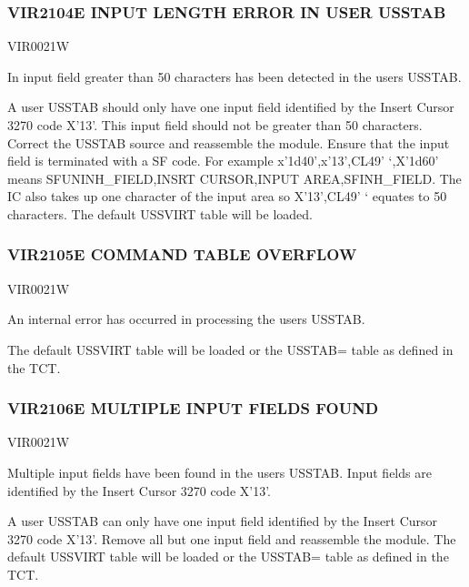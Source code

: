 \documentclass[letterpaper,10pt,english]{sphinxmanual}
\begin{document}
\subsubsection{VIR2104E INPUT LENGTH ERROR IN USER USSTAB}
\label{\detokenize{messages:vir2104e-input-length-error-in-user-usstab}}\begin{description}
\sphinxAtStartPar
VIR0021W

\sphinxAtStartPar
In input field greater than 50 characters has been detected in the users USSTAB.

\sphinxAtStartPar
A user USSTAB should only have one input field identified by the Insert Cursor 3270 code X’13’. This input field should not be greater than 50 characters. Correct the USSTAB source and reassemble the module. Ensure that the input field is terminated with a SF code. For example x’1d40’,x’13’,CL49’ ‘,X’1d60’ means SFUNINH\_FIELD,INSRT CURSOR,INPUT AREA,SFINH\_FIELD. The IC also takes up one character of the input area so X’13’,CL49’ ‘ equates to 50 characters. The default USSVIRT table will be loaded.

\end{description}


\subsubsection{VIR2105E COMMAND TABLE OVERFLOW}
\label{\detokenize{messages:vir2105e-command-table-overflow}}\begin{description}
\sphinxAtStartPar
VIR0021W

\sphinxAtStartPar
An internal error has occurred in processing the users USSTAB.

\sphinxAtStartPar
The default USSVIRT table will be loaded or the USSTAB= table as defined in the TCT.

\end{description}


\subsubsection{VIR2106E MULTIPLE INPUT FIELDS FOUND}
\label{\detokenize{messages:vir2106e-multiple-input-fields-found}}\begin{description}
\sphinxAtStartPar
VIR0021W

\sphinxAtStartPar
Multiple input fields have been found in the users USSTAB. Input fields are identified by the Insert Cursor 3270 code X’13’.

\sphinxAtStartPar
A user USSTAB can only have one input field identified by the Insert Cursor 3270 code X’13’. Remove all but one input field and reassemble the module. The default USSVIRT table will be loaded or the USSTAB= table as defined in the TCT.

\end{description}
\end{document}
